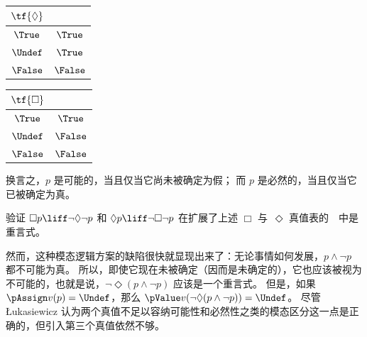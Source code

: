 \documentclass[../../../include/open-logic-section]{subfiles}
\begin{document}
\begin{center}
  \begin{tabular}{c|c}
    $\tf{\Diamond}$ & \\
    \hline
    $\True$ & $\True$ \\
    $\Undef$ & $\True$ \\
    $\False$ & $\False$
  \end{tabular}
  \quad
  \begin{tabular}{c|c}
    $\tf{\Box}$ & \\
    \hline
    $\True$ & $\True$ \\
    $\Undef$ & $\False$ \\
    $\False$ & $\False$
  \end{tabular}
\end{center}

换言之，$p$ 是可能的，当且仅当它尚未被确定为假；
而 $p$ 是必然的，当且仅当它已被确定为真。

\begin{prob}
  验证 $\Box p \liff \lnot\Diamond \lnot p$ 和 $\Diamond p \liff
  \lnot \Box \lnot p$ 在扩展了上述 $\Box$ 与~$\Diamond$ 真值表的~\LogLuk[3]~中是重言式。
\end{prob}

然而，这种模态逻辑方案的缺陷很快就显现出来了：无论事情如何发展，$p \land \lnot p$ 都不可能为真。
所以，即使它现在未被确定（因而是未确定的），它也应该被视为不可能的，也就是说，$\lnot \Diamond(p
\land \lnot p)$ 应该是一个重言式。
但是，如果 $\pAssign v(p) = \Undef$，那么 $\pValue v(\lnot \Diamond(p \land \lnot p)) =
\Undef$。
尽管 \L ukasiewicz 认为两个真值不足以容纳可能性和必然性之类的模态区分这一点是正确的，但引入第三个真值依然不够。
\end{document}
